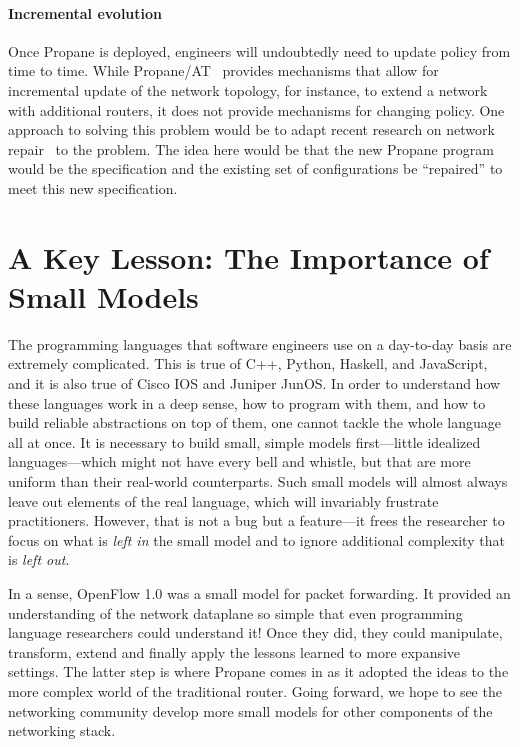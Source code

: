 \documentclass[10pt]{sigalternate052015}
\begin{document}
\paragraph*{Incremental evolution}
Once Propane is deployed, engineers will undoubtedly need to update
policy from time to time.  While
Propane/AT~\cite{abstract-propane} provides mechanisms that allow for
incremental update of the network topology, for instance, to extend a
network with additional routers, it does not provide mechanisms for
changing policy.  One approach to solving this problem would be to
adapt recent research on network repair~\cite{Gember-Jacobson:SOSP17}
to the problem.  The idea here would be that the new Propane
program would be the specification and the existing set of
configurations be ``repaired'' to meet this new specification.

\section{A Key Lesson:  The Importance of Small Models}
\label{sec:conclusions}

The programming languages that software engineers use on a day-to-day
basis are extremely complicated.  This is true of C++, Python, Haskell, and
JavaScript, and it is also true of Cisco IOS and Juniper JunOS.  In order to understand
how these languages work in a deep sense, how to program with them,
and how to build reliable abstractions on top of them, one cannot
tackle the whole language all at once.  It is necessary to build
small, simple models first---little idealized languages---which might
not have every bell and whistle, but that are more uniform than their
real-world counterparts.  Such
small models will almost always leave out elements of the
real language, which will invariably frustrate practitioners.
However, that is
not a bug  but a feature---it frees the researcher to focus on
what is \emph{left in} the small model and to ignore additional
complexity that is \emph{left out}.

In a sense, OpenFlow 1.0 was a small model for packet forwarding.  It provided an understanding of the network dataplane so
simple that even programming language researchers could understand it!
Once they did, they could manipulate, transform, extend and
finally apply the lessons learned to more expansive settings.  The
latter step is where Propane comes in as it adopted the ideas to the
more complex world of the traditional router.  Going forward, we hope
to see the networking community develop more small models for other
components of the networking stack.
\end{document}
